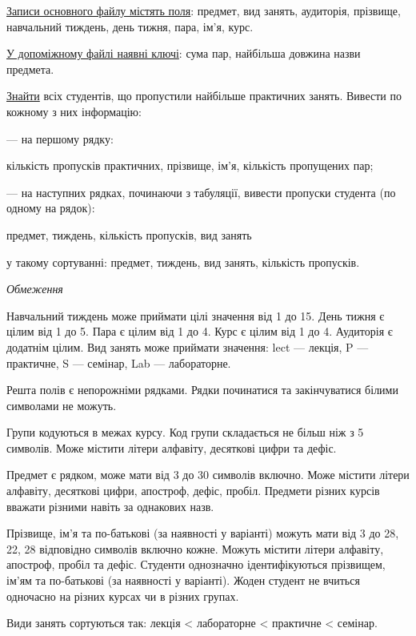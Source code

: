 \documentclass[11pt, ukrainian]{article}
\begin{document}
\underline{Записи основного файлу містять поля}: предмет, вид занять, аудиторія, прізвище, навчальний тиждень, день тижня, пара, ім’я, курс.

\underline{У допоміжному файлі наявні ключі}: сума пар, найбільша довжина назви предмета.

\underline{Знайти} всіх студентів, що пропустили найбільше практичних занять. Вивести по кожному з них інформацію:\par
{\noindent}--- на першому рядку:\par
кількість пропусків практичних, прізвище, ім’я, кількість пропущених пар;

{\noindent}--- на наступних рядках, починаючи з табуляції, вивести пропуски студента (по одному на рядок):\par
предмет, тиждень, кількість пропусків, вид занять

{\noindent}у такому сортуванні: предмет, тиждень, вид занять, кількість пропусків.


\bigskip\textit{Обмеження}

Навчальний тиждень може приймати цілі значення від 1 до 15.
День тижня є цілим від 1 до 5. Пара є цілим від 1 до 4.
Курс є цілим від 1 до 4. Аудиторія є додатнім цілим.
Вид занять може приймати значення:
lect --- лекція, P --- практичне, S --- семінар, Lab --- лабораторне.

Решта полів є непорожніми рядками.
Рядки починатися та закінчуватися білими символами не можуть.

Групи кодуються в межах курсу.
Код групи складається не більш ніж з 5 символів.
Може містити літери алфавіту, десяткові цифри та дефіс.

Предмет є рядком, може мати від 3 до 30 символів включно.
Може містити літери алфавіту, десяткові цифри, апостроф, дефіс, пробіл.
Предмети різних курсів вважати різними навіть за однакових назв.

Прізвище, ім’я та по-батькові (за наявності у варіанті)
можуть мати від 3 до 28, 22, 28 відповідно символів включно кожне.
Можуть містити літери алфавіту, апостроф, пробіл та дефіс.
Студенти однозначно ідентифікуються прізвищем, ім’ям та по-батькові (за наявності у варіанті).
Жоден студент не вчиться одночасно на різних курсах чи в різних групах.

Види занять сортуються так: лекція < лабораторне < практичне < семінар.

\end{document}

